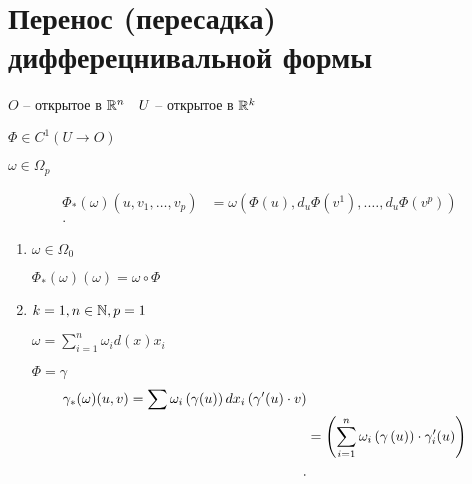\section{Перенос (пересадка) дифферецнивальной формы}

$O$ -- открытое в $\mathbb{R}^n\quad U$ -- открытое в $\mathbb{R}^k$

$\Phi\in C^1\left( U \to O \right) $

$\omega\in \Omega_p$

\begin{align*}
\Phi_*(\omega)(u, v_1, \ldots, v_p) &= \omega\left( \Phi(u), d_u\Phi(v^1), .\ldots, d_u\Phi(v^p) \right)  \\
.\end{align*}

\begin{example}
    \begin{enumerate}
        \item $\omega\in \Omega_0$
        
        $\Phi_*(\omega)(\omega) = \omega \circ \Phi$

        \item $k=1, n\in \mathbb{N}, p = 1$
        
        $\omega = \sum_{i=1}^{n} \omega_id(x)x_i$

        $\Phi = \gamma$
        \begin{align*}
            \gamma_*(\omega)(u,v) = \sum \omega_i\left( \gamma(u) \right) dx_i\left( \p \gamma(u)\cdot v \right)\\
            &= \left( \sum_{i=1}^{n} \omega_i\left( \gamma\left( u \right)  \right) \cdot \p \gamma_i(u)  \right)  \\ 
        .\end{align*}
    \end{enumerate}
\end{example}


